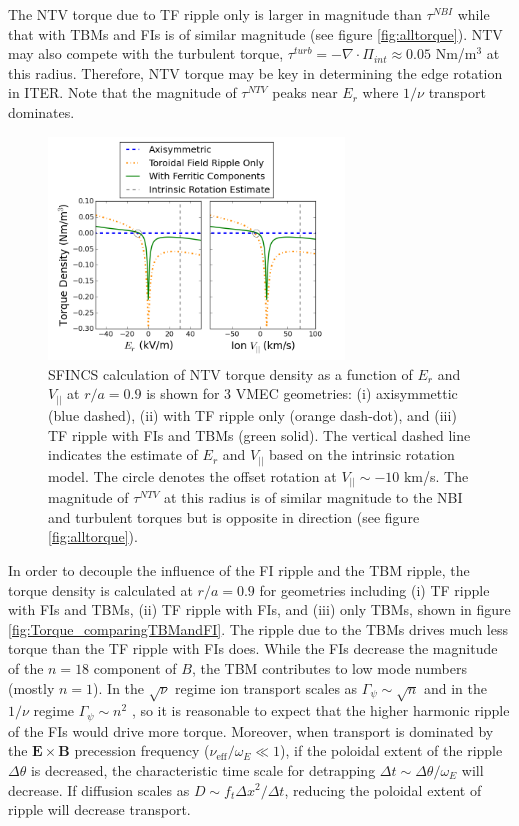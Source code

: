\documentclass{article}
\numberwithin{figure}{section}
\numberwithin{equation}{section}
\begin{document}
The NTV torque due to TF ripple only is larger in magnitude than $\tau^{NBI}$ while that with TBMs and FIs is of similar magnitude (see figure \ref{fig:alltorque}). NTV may also compete with the turbulent torque, $\tau^{turb} = - \nabla \cdot \Pi_{int} \approx 0.05$ Nm/m$^3$ at this radius. Therefore, NTV torque may be key in determining the edge rotation in ITER. Note that the magnitude of $\tau^{NTV}$ peaks near $E_r$ where $1/\nu$ transport dominates. 

\FloatBarrier

\begin{figure}[h!]
\centering
\includegraphics[width=0.7\textwidth]{Torque_ErandV.png}
\caption{\label{fig:Torque_ErandV} SFINCS calculation of NTV torque density as a function of $E_r$ and $V_{||}$ at $r/a = 0.9$ is shown for 3 VMEC geometries: (i) axisymmettic (blue dashed), (ii) with TF ripple only (orange dash-dot), and (iii) TF ripple with FIs and TBMs (green solid). The vertical dashed line indicates the estimate of $E_r$ and $V_{||}$ based on the intrinsic rotation model. The circle denotes the offset rotation at $V_{||} \sim -10$ km/s. The magnitude of $\tau^{NTV}$ at this radius is of similar magnitude to the NBI and turbulent torques but is opposite in direction (see figure \ref{fig:alltorque}).}
\end{figure}

In order to decouple the influence of the FI ripple and the TBM ripple, the torque density is calculated at $r/a = 0.9$ for geometries including (i) TF ripple with FIs and TBMs, (ii) TF ripple with FIs, and (iii) only TBMs, shown in figure \ref{fig:Torque_comparingTBMandFI}. The ripple due to the TBMs drives much less torque than the TF ripple with FIs does.  While the FIs decrease the magnitude of the $n = 18$ component of $B$, the TBM contributes to low mode numbers (mostly $n = 1$). In the $\sqrt{\nu}$ regime ion transport scales as $\Gamma_{\psi} \sim \sqrt{n}$ and in the $1/\nu$ regime $\Gamma_{\psi} \sim n^2$ \cite{Shaing2010}, so it is reasonable to expect that the higher harmonic ripple of the FIs would drive more torque. Moreover, when transport is dominated by the $\bm{E} \times \bm{B}$ precession frequency ($\nu_{\text{eff}}/\omega_E \ll 1$), if the poloidal extent of the ripple $\Delta \theta$ is decreased, the characteristic time scale for detrapping $\Delta t \sim \Delta \theta/ \omega_E$ will decrease. If diffusion scales as $D \sim f_t \Delta x^2/\Delta t$, reducing the poloidal extent of ripple will decrease transport. 
\end{document}
